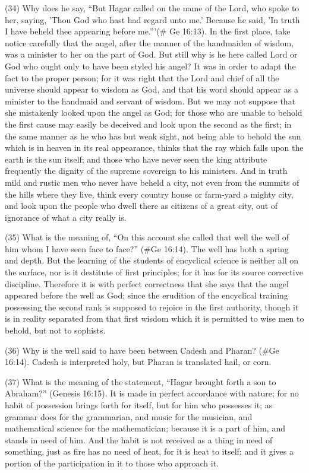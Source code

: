 (34) Why does he say, ``But Hagar called on the name of the Lord, who spoke to her, saying, 'Thou
God who hast had regard unto me.' Because he said, 'In truth I have beheld thee appearing before
me.'''(\# Ge 16:13). In the first place, take notice carefully that the angel, after the manner of
the handmaiden of wisdom, was a minister to her on the part of God. But still why is he here called
Lord or God who ought only to have been styled his angel? It was in order to adapt the fact to the
proper person; for it was right that the Lord and chief of all the universe should appear to wisdom
as God, and that his word should appear as a minister to the handmaid and servant of wisdom. But
we may not suppose that she mistakenly looked upon the angel as God; for those who are unable
to behold the first cause may easily be deceived and look upon the second as the first; in the same
manner as he who has but weak sight, not being able to behold the sun which is in heaven in its
real appearance, thinks that the ray which falls upon the earth is the sun itself; and those who have
never seen the king attribute frequently the dignity of the supreme sovereign to his ministers. And
in truth mild and rustic men who never have beheld a city, not even from the summits of the hills
where they live, think every country house or farm-yard a mighty city, and look upon the people who
dwell there as citizens of a great city, out of ignorance of what a city really is.

(35) What is the meaning of, ``On this account she called that well the well of him whom I have seen
face to face?'' (\#Ge 16:14). The well has both a spring and depth. But the learning of the
students of encyclical science is neither all on the surface, nor is it destitute of first principles; for it
has for its source corrective discipline. Therefore it is with perfect correctness that she says that
the angel appeared before the well as God; since the erudition of the encyclical training
possessing the second rank is supposed to rejoice in the first authority, though it is in reality
separated from that first wisdom which it is permitted to wise men to behold, but not to sophists.

(36) Why is the well said to have been between Cadesh and Pharan? (\#Ge 16:14). Cadesh is
interpreted holy, but Pharan is translated hail, or corn.

(37) What is the meaning of the statement, ``Hagar brought forth a son to Abraham?'' (Genesis
16:15). It is made in perfect accordance with nature; for no habit of possession brings forth for
itself, but for him who possesses it; as grammar does for the grammarian, and music for the
musician, and mathematical science for the mathematician; because it is a part of him, and stands
in need of him. And the habit is not received as a thing in need of something, just as fire has no
need of heat, for it is heat to itself; and it gives a portion of the participation in it to those who
approach it.

